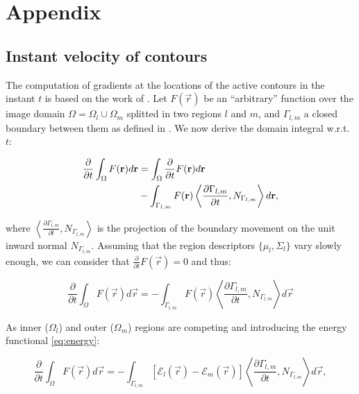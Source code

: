 \renewcommand{\theequation}{A.\arabic{equation}}

\section*{Appendix}

\subsection*{Instant velocity of contours}
\label{app:shape_priors}
The computation of gradients at the locations of the active contours in the
  instant $t$ is based on the work of \cite{herbulot_segmentation_2006}.
Let $F(\vec{r})$ be an ``arbitrary'' function over the image domain
  $\Omega = \Omega_l \cup \Omega_m$ splitted in two regions $l$ and
  $m$, and $\Gamma_{l,m}$ a closed boundary between them
  as defined in .
We now derive the domain integral w.r.t. $t$:

  \begin{align*}
  \frac{\partial}{\partial t} \int_\Omega F(\vec{r}) d\vec{r} &=
  \int_\Omega \frac{\partial}{\partial t}F(\vec{r}) d\vec{r} \notag\\
  &- \int_{\Gamma_{l,m}} F(\vec{r}) \left\langle \frac{\partial \Gamma_{l,m} }{\partial t},
  N_{\Gamma_{l,m}}\right\rangle d\vec{r},
  \end{align*}

  where $\left\langle\frac{\partial\Gamma_{l,m}}{\partial t}, N_{\Gamma_{l,m}}\right\rangle$ is
  the projection of the boundary movement on the unit inward normal $N_{\Gamma_{l,m}}$.
Assuming that the region descriptors $\{\mu_l, \Sigma_l\}$ vary slowly enough, we can consider
  that $\frac{\partial}{\partial t} F(\vec{r}) = 0$ and thus:

  \begin{equation*}
  \frac{\partial}{\partial t} \int_\Omega F(\vec{r}) d\vec{r} =
  - \int_{\Gamma_{l,m}} F(\vec{r}) \left\langle \frac{\partial \Gamma_{l,m} }{\partial t},
  N_{\Gamma_{l,m}}\right\rangle d\vec{r}
  \end{equation*}

  As inner ($\Omega_l$) and outer ($\Omega_m$) regions are competing and introducing
    the energy functional \eqref{eq:energy}:

    \begin{equation}
    \frac{\partial}{\partial t} \int_\Omega F(\vec{r}) d\vec{r} =
    - \int_{\Gamma_{l,m}} \left[ \mathcal{E}_{l}(\vec{r}) - \mathcal{E}_{m}(\vec{r}) \right]
    \left\langle \frac{\partial \Gamma_{l,m} }{\partial t},
  N_{\Gamma_{l,m}}\right\rangle d\vec{r},
  	\label{eq:shape_gradients}
    \end{equation}


